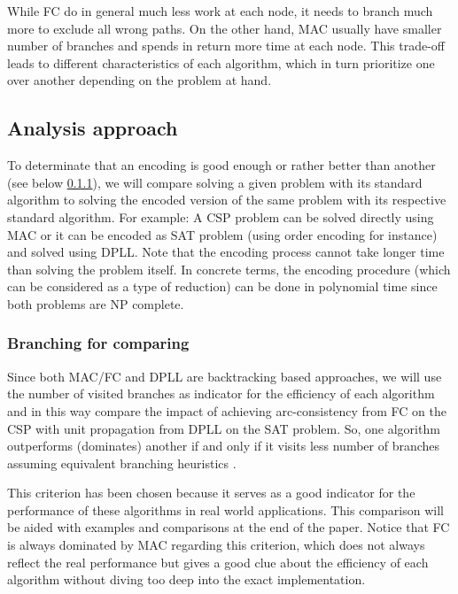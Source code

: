 While FC do in general much less work at each node, it needs to branch much more to exclude all wrong paths. On the other hand, MAC usually have smaller number of branches and spends in return more time at each node. This trade-off leads to different characteristics of each algorithm, which in turn prioritize one over another depending on the problem at hand.

\subsection{Analysis approach}
To determinate that an encoding is good enough or rather better than another (see below \ref{subsec:branching_for_comparing}), we will compare solving a given problem with its standard algorithm to solving the encoded version of the same problem with its respective standard algorithm. For example: A CSP problem can be solved directly using MAC or it can be encoded as SAT problem (using order encoding for instance) and solved using DPLL. Note that the encoding process cannot take longer time than solving the problem itself. In concrete terms, the encoding procedure (which can be considered as a type of reduction) can be done in polynomial time since both problems are NP complete.

\subsubsection{Branching for comparing}\label{subsec:branching_for_comparing}
Since both MAC/FC and DPLL are backtracking based approaches, we will use the number of visited branches as indicator for the efficiency of each algorithm and in this way compare the impact of achieving arc-consistency from FC on the CSP with unit propagation from DPLL on the SAT problem. So, one algorithm outperforms (dominates) another if and only if it visits less number of branches assuming equivalent branching heuristics \cite{walsh2000sat}.

This criterion has been chosen because it serves as a good indicator for the performance of these algorithms in real world applications. This comparison will be aided with examples and comparisons at the end of the paper.
Notice that FC is always dominated by MAC regarding this criterion, which does not always reflect the real performance but gives a good clue about the efficiency of each algorithm without diving too deep into the exact implementation.
